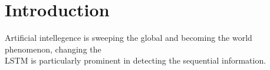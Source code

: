 \section{Introduction}
Artificial intellegence is sweeping the global and becoming the world phenomenon, changing the 
\\
LSTM is particularly prominent in detecting the sequential information. 